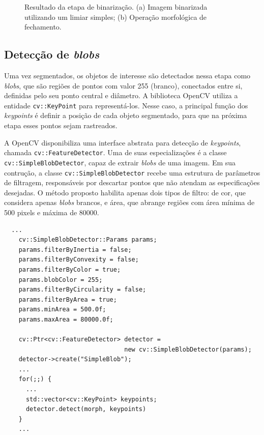 \begin{figure}[ht]
\begin{center}
\begin{subfigure}[b]{.49\textwidth}
\begin{center}
      \end{center}
      \caption{}
      \label{fig:morph}
    \end{subfigure}
  \end{center}
  \caption{Resultado da etapa de binarização. (a) Imagem binarizada utilizando um limiar simples; (b) Operação morfológica de fechamento.}
  \label{fig:bin_morph}
\end{figure}


\subsection{Detecção de \textit{blobs}} %
\label{sub:detec_o_de_blobs}

Uma vez segmentados, os objetos de interesse são detectados nessa etapa como \textit{blobs}, que são regiões de pontos com valor 255 (branco), conectados entre si, definidas pelo seu ponto central e diâmetro. A biblioteca OpenCV utiliza a entidade \verb!cv::KeyPoint! para representá-los. Nesse caso, a principal função dos \textit{keypoints} é definir a posição de cada objeto segmentado, para que na próxima etapa esses pontos sejam rastreados.

A OpenCV disponibiliza uma interface abstrata para detecção de \textit{keypoints}, chamada \verb!cv::FeatureDetector!. Uma de suas especializações é a classe \verb!cv::SimpleBlobDetector!, capaz de extrair \textit{blobs} de uma imagem. Em sua contrução, a classe \verb!cv::SimpleBlobDetector! recebe uma estrutura de parâmetros de filtragem, responsáveis por descartar pontos que não atendam as especificações desejadas. O método proposto habilita apenas dois tipos de filtro: de cor, que considera apenas \textit{blobs} brancos, e área, que abrange regiões com área mínima de 500 pixels e máxima de 80000.

\begin{lstlisting}
  ...
    cv::SimpleBlobDetector::Params params;
    params.filterByInertia = false;
    params.filterByConvexity = false;
    params.filterByColor = true;
    params.blobColor = 255;
    params.filterByCircularity = false;
    params.filterByArea = true;
    params.minArea = 500.0f;
    params.maxArea = 80000.0f;

    cv::Ptr<cv::FeatureDetector> detector = 
                                 new cv::SimpleBlobDetector(params);
    detector->create("SimpleBlob");
    ...
    for(;;) {
      ...
      std::vector<cv::KeyPoint> keypoints;
      detector.detect(morph, keypoints)
    }
    ...  
\end{lstlisting}

